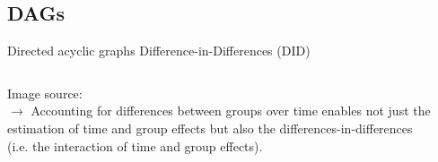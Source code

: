 \documentclass[aspectratio=169]{beamer}
\begin{document}
	\subsection{DAGs}
		\begin{frame}{Directed acyclic graphs}
			Difference-in-Differences (DID)
			\\ \vspace*{-.35cm}
			\begin{columns}
				\begin{column}{0.5\textwidth}
					\begin{center}
					\end{center}
				\end{column}
				\begin{column}{0.5\textwidth}
					\begin{center}
					\end{center}
				\end{column}
			\end{columns}
			\scriptsize Image source: \href{http://nickchk.com/causalgraphs.html}{\underline{}}
			\\ \vspace*{.25cm}
			\small \onslide<3> {$\rightarrow$ Accounting for differences between groups over time enables not just the estimation of time and group effects but also the differences-in-differences \\ (i.e. the interaction of time and group effects).}
		\end{frame}
\end{document}

